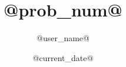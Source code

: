 \documentclass{article}
\title{@prob_num@}
\author{@user_name@}
\date{@current_date@}
\begin{document}
\maketitle

\begin{enumerate}

\end{enumerate}
\end{document}
